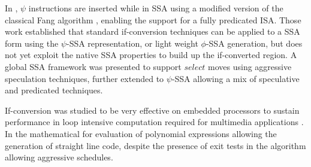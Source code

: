 In \cite{Stoutchinin_Gao_2004}, $\psi$ instructions are inserted while in SSA using a modified version of the classical Fang algorithm \cite{Fang:1996:CAI:645674.663446}, enabling the support for a fully predicated ISA.
Those work established that standard if-conversion techniques can be applied to a SSA form using the $\psi$-SSA representation, or light weight $\phi$-SSA generation, but does not yet exploit the native SSA properties to build up the if-converted region.
A global SSA framework was presented \cite{odes_bruel} to support $select$ moves using aggressive speculation techniques, further extended to $\psi$-SSA \cite{ijes_bruel} allowing a mix of speculative and predicated techniques.

If-conversion was studied to be very effective on embedded processors to sustain performance in loop intensive computation required for multimedia applications \cite{FisherFaraboshiYoung}. In the mathematical for evaluation of polynomial expressions \cite{Jeannerod:2010:TTI:1837210.1837212} allowing the generation of straight line code, despite the presence of exit tests in the algorithm allowing aggressive schedules.




